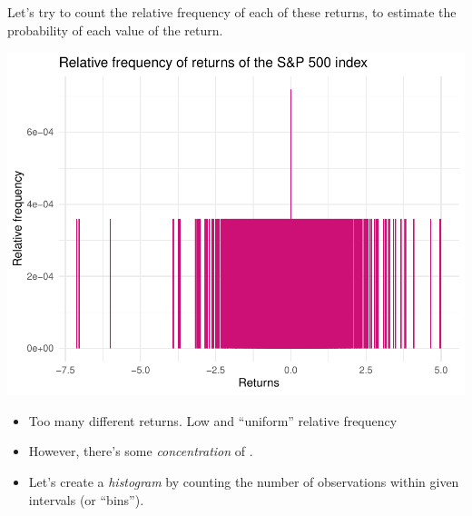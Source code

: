 \documentclass[notes=show,smaller]{beamer}\usepackage[]{graphicx}\usepackage[]{color}
\newenvironment{knitrout}{}{} %
\begin{document}
\begin{frame}{\secname}
\begin{example}
  \begin{footnotesize}
  Let's try to count the relative frequency of each of these returns, to
  estimate the probability of each value of the return.
\begin{knitrout}
\color{fgcolor}

{\centering \includegraphics[width=0.5\linewidth]{figure/unnamed-chunk-3-1} 

}



\end{knitrout}
  \begin{itemize}
    \item Too many different returns. Low and ``uniform'' relative frequency
    \item However, there's some \emph{concentration} of .
    \item Let's create a \textit{histogram} by counting the number of observations within given intervals (or ``bins'').
  \end{itemize}
  \end{footnotesize}
  \end{example}
\end{frame}
\end{document}
